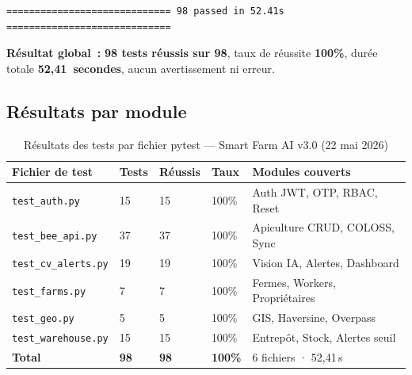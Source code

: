 \begin{lstlisting}
============================= 98 passed in 52.41s =============================
\end{lstlisting}

\noindent\textbf{Résultat global~:} \textbf{98 tests réussis sur 98}, taux de réussite \textbf{100\%},
durée totale \textbf{52,41~secondes}, aucun avertissement ni erreur.

\subsection{Résultats par module}

\begin{table}[H]
\centering
\caption{Résultats des tests par fichier pytest --- Smart Farm AI v3.0 (22 mai 2026)}
\label{tab:tests_modules}
\small
\renewcommand{\arraystretch}{1.25}
\begin{tabularx}{\textwidth}{@{}p{5.2cm} l l l X@{}}
\toprule
\textbf{Fichier de test} & \textbf{Tests} & \textbf{Réussis} & \textbf{Taux} & \textbf{Modules couverts} \\
\midrule
\texttt{test\_auth.py}        & 15 & 15 & 100\% & Auth JWT, OTP, RBAC, Reset \\
\texttt{test\_bee\_api.py}    & 37 & 37 & 100\% & Apiculture CRUD, COLOSS, Sync \\
\texttt{test\_cv\_alerts.py}  & 19 & 19 & 100\% & Vision IA, Alertes, Dashboard \\
\texttt{test\_farms.py}       & 7  & 7  & 100\% & Fermes, Workers, Propriétaires \\
\texttt{test\_geo.py}         & 5  & 5  & 100\% & GIS, Haversine, Overpass \\
\texttt{test\_warehouse.py}   & 15 & 15 & 100\% & Entrepôt, Stock, Alertes seuil \\
\midrule
\textbf{Total}                & \textbf{98} & \textbf{98} & \textbf{100\%} & 6 fichiers · 52,41\,s \\
\bottomrule
\end{tabularx}
\end{table}

